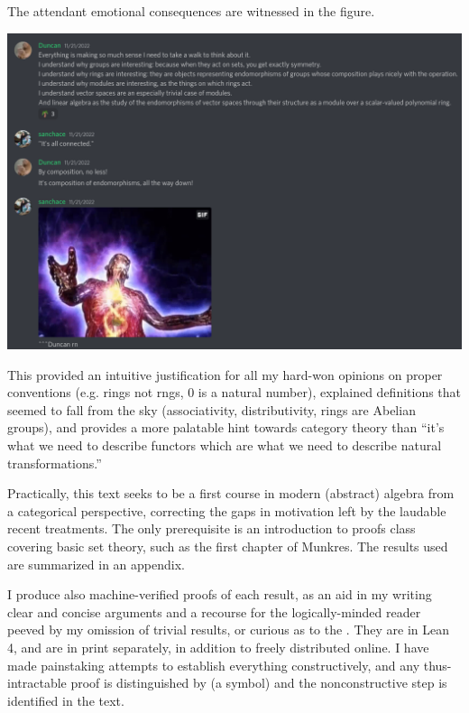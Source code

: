 \documentclass{book}
\begin{document}
The attendant emotional consequences are witnessed in the figure.

\begin{center}
  \includegraphics[scale=0.3]{galaxy_brain.png}
\end{center}

This provided an intuitive justification for all my hard-won opinions on proper conventions (e.g. rings not rngs, 0 is a natural number),
explained definitions that seemed to fall from the sky (associativity, distributivity, rings are Abelian groups),
and provides a more palatable hint towards category theory than ``it's what we need to describe functors which are what we need to describe
natural transformations.''

Practically, this text seeks to be a first course in modern (abstract) algebra from a categorical perspective,
correcting the gaps in motivation left by the laudable recent treatments. %
The only prerequisite is an introduction to proofs class covering basic set theory, such as the first chapter of Munkres.
The results used are summarized in an appendix.

I produce also machine-verified proofs of each result, as an aid in my writing clear and concise arguments
and a recourse for the logically-minded reader peeved by my omission of trivial results, or curious as to the .
They are in Lean 4, and are in print separately, in addition to freely distributed online.
I have made painstaking attempts to establish everything constructively, and any thus-intractable proof is distinguished by (a symbol) %
and the nonconstructive step is identified in the text.

\tableofcontents
\end{document}
